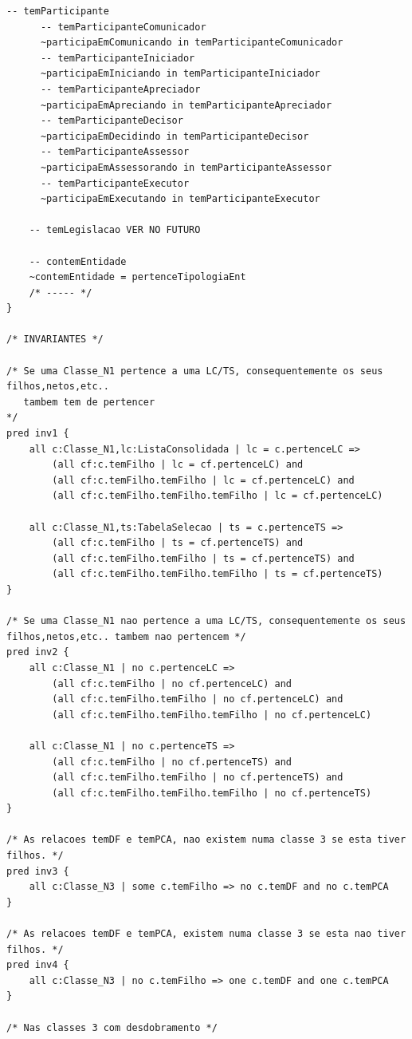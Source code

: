 \documentclass[tikz,runningheads,a4paper]{llncs}
\begin{document}
\begin{subappendices}
\begin{lstlisting}[language=alloy, frame=single]
	-- temParticipante
      -- temParticipanteComunicador
	  ~participaEmComunicando in temParticipanteComunicador
      -- temParticipanteIniciador
      ~participaEmIniciando in temParticipanteIniciador
      -- temParticipanteApreciador
      ~participaEmApreciando in temParticipanteApreciador
      -- temParticipanteDecisor
      ~participaEmDecidindo in temParticipanteDecisor
      -- temParticipanteAssessor
      ~participaEmAssessorando in temParticipanteAssessor
      -- temParticipanteExecutor
      ~participaEmExecutando in temParticipanteExecutor

	-- temLegislacao VER NO FUTURO

	-- contemEntidade
	~contemEntidade = pertenceTipologiaEnt
	/* ----- */
}

/* INVARIANTES */

/* Se uma Classe_N1 pertence a uma LC/TS, consequentemente os seus filhos,netos,etc..
   tambem tem de pertencer
*/
pred inv1 {
	all c:Classe_N1,lc:ListaConsolidada | lc = c.pertenceLC =>
		(all cf:c.temFilho | lc = cf.pertenceLC) and
		(all cf:c.temFilho.temFilho | lc = cf.pertenceLC) and
	    (all cf:c.temFilho.temFilho.temFilho | lc = cf.pertenceLC)

	all c:Classe_N1,ts:TabelaSelecao | ts = c.pertenceTS =>
		(all cf:c.temFilho | ts = cf.pertenceTS) and
		(all cf:c.temFilho.temFilho | ts = cf.pertenceTS) and
	    (all cf:c.temFilho.temFilho.temFilho | ts = cf.pertenceTS)
}

/* Se uma Classe_N1 nao pertence a uma LC/TS, consequentemente os seus filhos,netos,etc.. tambem nao pertencem */
pred inv2 {
	all c:Classe_N1 | no c.pertenceLC =>
		(all cf:c.temFilho | no cf.pertenceLC) and
		(all cf:c.temFilho.temFilho | no cf.pertenceLC) and
	    (all cf:c.temFilho.temFilho.temFilho | no cf.pertenceLC)

	all c:Classe_N1 | no c.pertenceTS =>
		(all cf:c.temFilho | no cf.pertenceTS) and
		(all cf:c.temFilho.temFilho | no cf.pertenceTS) and
	    (all cf:c.temFilho.temFilho.temFilho | no cf.pertenceTS)
}

/* As relacoes temDF e temPCA, nao existem numa classe 3 se esta tiver filhos. */
pred inv3 {
	all c:Classe_N3 | some c.temFilho => no c.temDF and no c.temPCA
}

/* As relacoes temDF e temPCA, existem numa classe 3 se esta nao tiver filhos. */
pred inv4 {
	all c:Classe_N3 | no c.temFilho => one c.temDF and one c.temPCA
}

/* Nas classes 3 com desdobramento */


\end{lstlisting}
\end{subappendices}
\end{document}
